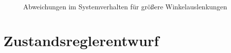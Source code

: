 \documentclass[
	pagesize,
	fontsize=12pt,
	paper=a4,
	oneside,
   reqno
]{scrartcl}
\begin{document}
\begin{figure}[H]
    \centering
    \caption[Vergleich der beiden Winkelverläufe in Grad mit Abweichung]{Abweichungen im Systemverhalten für größere Winkelauslenkungen}
    \label{fig:Bild6}
\end{figure}

\clearpage

\section{Zustandsreglerentwurf} \label{sec:Zustandsreglerentwurf}
\end{document}
